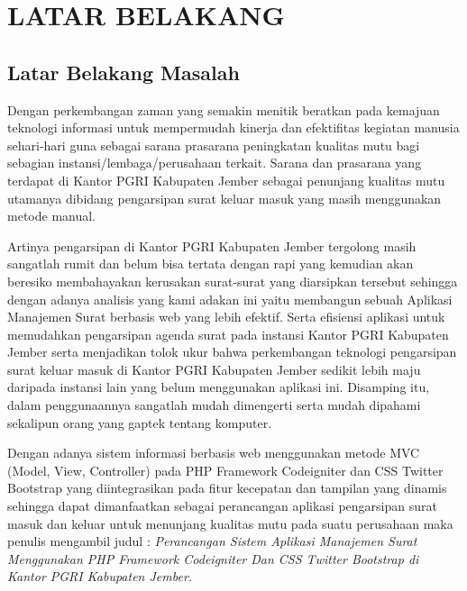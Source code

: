 \documentclass{jtetiproposalskripsi}
\begin{document}
\chapter{LATAR BELAKANG}

\section{Latar Belakang Masalah}
Dengan perkembangan zaman yang semakin menitik beratkan pada kemajuan teknologi informasi untuk mempermudah kinerja dan efektifitas kegiatan manusia sehari-hari guna sebagai sarana prasarana peningkatan kualitas mutu bagi sebagian instansi/lembaga/perusahaan terkait. Sarana dan prasarana yang terdapat di Kantor PGRI Kabupaten Jember sebagai penunjang kualitas mutu utamanya dibidang pengarsipan surat keluar masuk yang masih menggunakan metode manual. 

Artinya pengarsipan di Kantor PGRI Kabupaten Jember tergolong masih sangatlah rumit dan belum bisa tertata dengan rapi yang kemudian akan beresiko membahayakan kerusakan surat-surat yang diarsipkan tersebut sehingga dengan adanya analisis yang kami adakan ini yaitu membangun sebuah Aplikasi Manajemen Surat berbasis web yang lebih efektif. Serta efisiensi aplikasi untuk memudahkan pengarsipan agenda surat pada instansi Kantor PGRI Kabupaten Jember serta menjadikan tolok ukur bahwa perkembangan teknologi pengarsipan surat keluar masuk di Kantor PGRI Kabupaten Jember sedikit lebih maju daripada instansi lain yang belum menggunakan aplikasi ini. Disamping itu, dalam penggunaannya sangatlah mudah dimengerti serta mudah dipahami sekalipun orang yang gaptek tentang komputer. 

Dengan adanya sistem informasi berbasis web menggunakan metode MVC (Model, View, Controller) pada PHP Framework Codeigniter dan CSS Twitter Bootstrap yang diintegrasikan pada fitur kecepatan dan tampilan yang dinamis sehingga dapat dimanfaatkan sebagai perancangan aplikasi pengarsipan surat masuk dan keluar untuk menunjang kualitas mutu pada suatu perusahaan maka penulis mengambil judul : \textit{Perancangan Sistem Aplikasi Manajemen Surat Menggunakan PHP Framework Codeigniter  Dan CSS Twitter Bootstrap  di Kantor PGRI Kabupaten Jember.}
\end{document}
